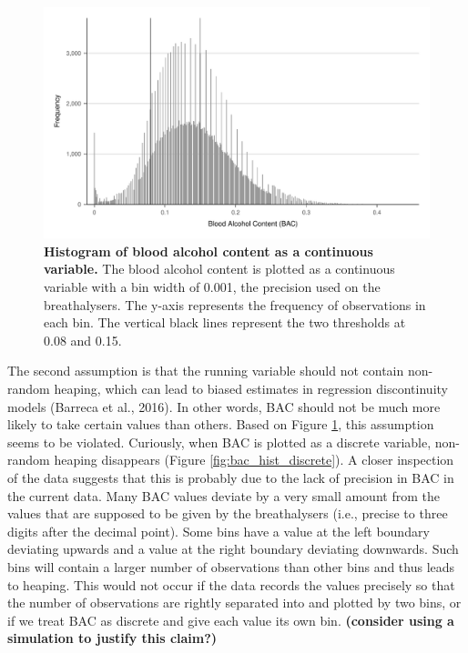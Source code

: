 \documentclass[
  11pt,
]{article}
\begin{document}
\begin{figure}[H]
  \centering
  \includegraphics[width=0.9\columnwidth]{../figures/bac_histogram_continuous.pdf}
  \caption{\textbf{Histogram of blood alcohol content as a continuous variable.} The blood alcohol content is plotted as a continuous variable with a bin width of 0.001, the precision used on the breathalysers. The y-axis represents the frequency of observations in each bin. The vertical black lines represent the two thresholds at 0.08 and 0.15.}
  \label{fig:bac_hist_continuous}
\end{figure}

The second assumption is that the running variable should not contain
non-random heaping, which can lead to biased estimates in regression
discontinuity models (Barreca et al., 2016). In other words, BAC should
not be much more likely to take certain values than others. Based on
Figure \ref{fig:bac_hist_continuous}, this assumption seems to be
violated. Curiously, when BAC is plotted as a discrete variable,
non-random heaping disappears (Figure \ref{fig:bac_hist_discrete}). A
closer inspection of the data suggests that this is probably due to the
lack of precision in BAC in the current data. Many BAC values deviate by
a very small amount from the values that are supposed to be given by the
breathalysers (i.e., precise to three digits after the decimal point).
Some bins have a value at the left boundary deviating upwards and a
value at the right boundary deviating downwards. Such bins will contain
a larger number of observations than other bins and thus leads to
heaping. This would not occur if the data records the values precisely
so that the number of observations are rightly separated into and
plotted by two bins, or if we treat BAC as discrete and give each value
its own bin. \textbf{(consider using a simulation to justify this
claim?)}
\end{document}
